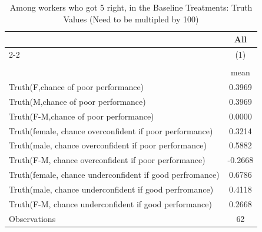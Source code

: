 \begin{table}[htbp]\centering
\def\sym#1{\ifmmode^{#1}\else\(^{#1}\)\fi}
\caption{Among workers who got 5 right, in the Baseline Treatments: Truth Values (Need to be multipled by 100)}
\begin{tabular}{l*{1}{c}}
\hline\hline
                    &\multicolumn{1}{c}{All}\\\cmidrule(lr){2-2}
                    &\multicolumn{1}{c}{(1)}\\
                    &\multicolumn{1}{c}{}\\
                    &        mean\\
\hline
Truth(F,chance of poor performance)&      0.3969\\
Truth(M,chance of poor performance)&      0.3969\\
Truth(F-M,chance of poor performance)&      0.0000\\
Truth(female, chance overconfident if poor performance)&      0.3214\\
Truth(male, chance overconfident if poor performance)&      0.5882\\
Truth(F-M, chance overconfident if poor performance)&     -0.2668\\
Truth(female, chance underconfident if good perfromance)&      0.6786\\
Truth(male, chance underconfident if good perfromance)&      0.4118\\
Truth(F-M, chance underconfident if good performance)&      0.2668\\
\hline
Observations        &          62\\
\hline\hline
\end{tabular}
\end{table}
